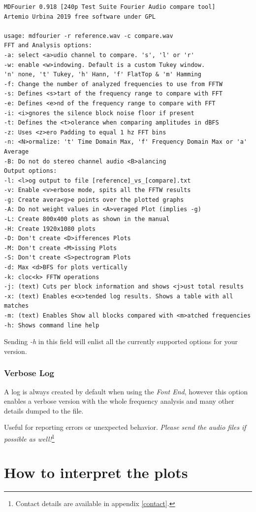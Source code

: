 \documentclass[10pt,a4paper]{report}
\begin{document}
\begin{verbatim}
MDFourier 0.918 [240p Test Suite Fourier Audio compare tool]
Artemio Urbina 2019 free software under GPL

usage: mdfourier -r reference.wav -c compare.wav
FFT and Analysis options:
-a: select <a>udio channel to compare. 's', 'l' or 'r'
-w: enable <w>indowing. Default is a custom Tukey window.
'n' none, 't' Tukey, 'h' Hann, 'f' FlatTop & 'm' Hamming
-f: Change the number of analyzed frequencies to use from FFTW
-s: Defines <s>tart of the frequency range to compare with FFT
-e: Defines <e>nd of the frequency range to compare with FFT
-i: <i>gnores the silence block noise floor if present
-t: Defines the <t>olerance when comparing amplitudes in dBFS
-z: Uses <z>ero Padding to equal 1 hz FFT bins
-n: <N>ormalize: 't' Time Domain Max, 'f' Frequency Domain Max or 'a' Average
-B: Do not do stereo channel audio <B>alancing
Output options:
-l: <l>og output to file [reference]_vs_[compare].txt
-v: Enable <v>erbose mode, spits all the FFTW results
-g: Create avera<g>e points over the plotted graphs
-A: Do not weight values in <A>veraged Plot (implies -g)
-L: Create 800x400 plots as shown in the manual
-H: Create 1920x1080 plots
-D: Don't create <D>ifferences Plots
-M: Don't create <M>issing Plots
-S: Don't create <S>pectrogram Plots
-d: Max <d>BFS for plots vertically
-k: cloc<k> FFTW operations
-j: (text) Cuts per block information and shows <j>ust total results
-x: (text) Enables e<x>tended log results. Shows a table with all matches
-m: (text) Enables Show all blocks compared with <m>atched frequencies
-h: Shows command line help
\end{verbatim}

Sending \textit{-h} in this field will enlist all the currently supported options for your version.

\subsection{Verbose Log}
\label{verbose}

A log is always created by default when using the \textit{Font End}, however this option enables a verbose version with the whole frequency analysis and many other details dumped to the file. 

Useful for reporting errors or unexpected behavior. \textit{Please send the audio files if possible as well!}\footnote{Contact details are available in appendix \ref{contact}.}

\chapter{How to interpret the plots}
\label{howtoplots}
\end{document}
